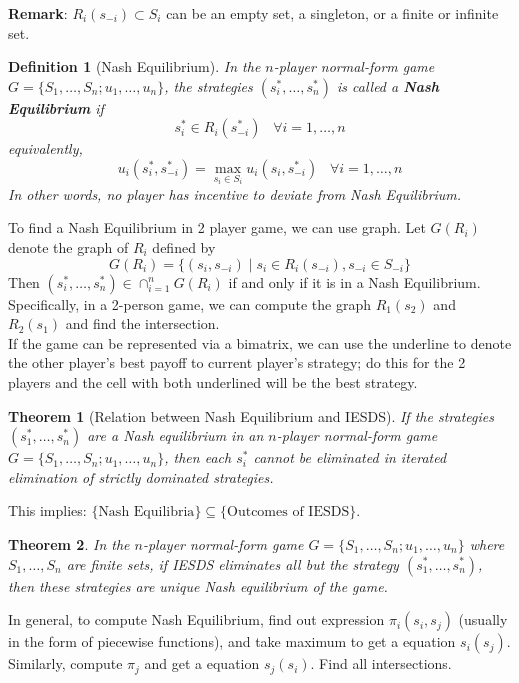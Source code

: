 \documentclass[12pt]{article}
\newtheorem{definition}{Definition}[section]
\newtheorem{theorem}{Theorem}[section]
\theoremstyle{definition}
\begin{document}
\textbf{Remark}: $R_i(s_{-i})\subset S_i$ can be an empty set, a singleton, or a finite or infinite set.
\begin{definition}[Nash Equilibrium]
\normalfont In the $n$-player normal-form game $G=\{S_1,\ldots, S_n; u_1,\ldots, u_n\}$, the strategies $(s_i^\ast, \ldots, s_n^\ast)$ is called a \textbf{Nash Equilibrium} if
\[
s_i^\ast \in R_i(s_{-i}^\ast) \;\;\;\forall i=1,\ldots, n
\]
equivalently, 
\[
u_i(s_i^\ast, s_{-i}^\ast) = \max_{s_i\in S_i} u_i(s_i, s_{-i}^\ast)\;\;\;\forall i=1,\ldots, n
\]
In other words, no player has incentive to deviate from Nash Equilibrium.
\end{definition}
To find a Nash Equilibrium in 2 player game, we can use graph. Let $G(R_i)$ denote the graph of $R_i$ defined by
\[
G(R_i)=\{(s_i, s_{-i})\mid s_i\in R_i(s_{-i}), s_{-i}\in S_{-i}\}
\]
Then $(s_i^\ast, \ldots, s_n^\ast)\in \cap_{i=1}^n G(R_i)$ if and only if it is in a Nash Equilibrium.\\
Specifically, in a 2-person game, we can compute the graph $R_1(s_2)$ and $R_2(s_1)$ and find the intersection.\\
If the game can be represented via a bimatrix, we can use the underline to denote the other player's best payoff to current player's strategy; do this for the 2 players and the cell with both underlined will be the best strategy.
\begin{theorem}[Relation between Nash Equilibrium and IESDS]
\normalfont If the strategies $(s_1^\ast, \ldots, s_n^\ast)$ are a Nash equilibrium in an $n$-player normal-form game $G=\{S_1,\ldots, S_n; u_1,\ldots, u_n\}$, then each $s_i^\ast$ cannot be eliminated in iterated elimination of strictly dominated strategies.
\end{theorem}
This implies: $\{\text{Nash Equilibria}\}\subseteq \{\text{Outcomes of IESDS}\}$.
\begin{theorem}
\normalfont In the $n$-player normal-form game $G=\{S_1,\ldots, S_n; u_1,\ldots, u_n\}$ where $S_1,\ldots, S_n$ are \textit{finite} sets, if IESDS eliminates all but the strategy $(s_1^\ast, \ldots, s_n^\ast)$, then these strategies are unique Nash equilibrium of the game.
\end{theorem}
In general, to compute Nash Equilibrium, find out expression $\pi_i(s_i, s_j)$ (usually in the form of piecewise functions), and take maximum to get a equation $s_i(s_j)$. Similarly, compute $\pi_j$ and get a equation $s_j(s_i)$. Find all intersections.
\end{document}
